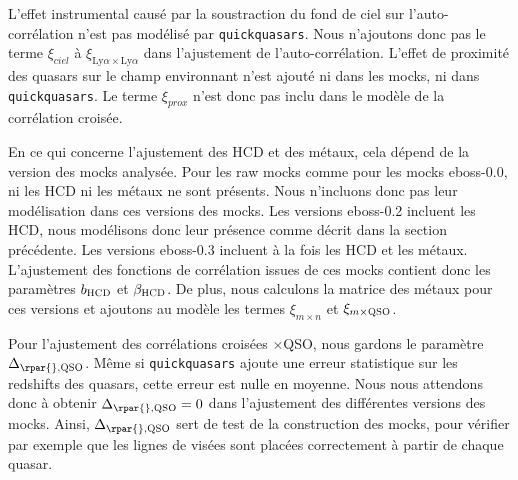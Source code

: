 L'effet instrumental causé par la soustraction du fond de ciel sur l'auto-corrélation n'est pas modélisé par \texttt{quickquasars}. Nous n'ajoutons donc pas le terme $\xi_{ciel}$ à $\xi_{\mathrm{Ly}\alpha\times\mathrm{Ly}\alpha}$ dans l'ajustement de l'auto-corrélation.
L'effet de proximité des quasars sur le champ \lya{} environnant n'est ajouté ni dans les mocks, ni dans \texttt{quickquasars}. Le terme
$\xi_{prox}$ n'est donc pas inclu dans le modèle de la corrélation croisée.

En ce qui concerne l'ajustement des HCD et des métaux, cela dépend de la version des mocks analysée.
Pour les raw mocks comme pour les mocks eboss-0.0, ni les HCD ni les métaux ne sont présents. Nous n'incluons donc pas leur modélisation dans ces versions des mocks.
Les versions eboss-0.2 incluent les HCD, nous modélisons donc leur présence comme décrit dans la section précédente.
Les versions eboss-0.3 incluent à la fois les HCD et les métaux. L'ajustement des fonctions de corrélation issues de ces mocks contient donc les paramètres $b_{\textsc{HCD}}$ et $\beta_{\textsc{HCD}}$. De plus, nous calculons la matrice des métaux pour ces versions et ajoutons au modèle les termes $\xi_{m\times n}$ et $\xi_{m\times \textsc{QSO}}$.

Pour l'ajustement des corrélations croisées \lya{}$\times$QSO, nous gardons le paramètre $\Delta_{\rpar{}, \textsc{QSO}}$. Même si \texttt{quickquasars} ajoute une erreur statistique sur les redshifts des quasars, cette erreur est nulle en moyenne. Nous nous attendons donc à obtenir $\Delta_{\rpar{}, \textsc{QSO}} = 0$ dans l'ajustement des différentes versions des mocks. Ainsi, $\Delta_{\rpar{}, \textsc{QSO}}$ sert de test de la construction des mocks, pour vérifier par exemple que les lignes de visées sont placées correctement à partir de chaque quasar.

